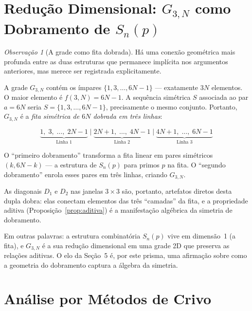 \documentclass[12pt,a4paper]{article}
\theoremstyle{remark}
\newtheorem{remark}[theorem]{Observa\c{c}\~ao}
\begin{document}
	\section{Redu\c{c}\~ao Dimensional: $G_{3,N}$ como Dobramento de $S_n(p)$}
	
	\begin{remark}[A grade como fita dobrada]
		H\'a uma conex\~ao geom\'etrica mais profunda entre as duas estruturas que permanece
		impl\'icita nos argumentos anteriores, mas merece ser registrada explicitamente.
		
		A grade $G_{3,N}$ cont\'em os \'impares $\{1, 3, \ldots, 6N-1\}$ --- exatamente
		$3N$ elementos.  O maior elemento \'e $f(3,N) = 6N-1$.
		A sequ\^encia sim\'etrica $S$ associada ao par $a = 6N$ seria
		$S = \{1, 3, \ldots, 6N-1\}$, precisamente o mesmo conjunto.
		Portanto, $G_{3,N}$ \'e a \emph{fita sim\'etrica de $6N$ dobrada em tr\^es linhas}:
		
		\[
		\underbrace{1,\; 3,\;\ldots,\; 2N-1}_{\text{Linha 1}}
		\;\Big|\;
		\underbrace{2N+1,\;\ldots,\; 4N-1}_{\text{Linha 2}}
		\;\Big|\;
		\underbrace{4N+1,\;\ldots,\; 6N-1}_{\text{Linha 3}}
		\]
		
		O ``primeiro dobramento'' transforma a fita linear em pares sim\'etricos $(k, 6N-k)$
		--- a estrutura de $S_n(p)$ para primos $p$ na fita.
		O ``segundo dobramento'' enrola esses pares em tr\^es linhas, criando $G_{3,N}$.
		
		As diagonais $D_1$ e $D_2$ nas janelas $3\times 3$ s\~ao, portanto, artefatos diretos
		desta dupla dobra: elas conectam elementos das tr\^es ``camadas'' da fita,
		e a propriedade aditiva (Proposi\c{c}\~ao~\ref{prop:aditiva}) \'e a manifesta\c{c}\~ao
		alg\'ebrica da simetria de dobramento.
		
		Em outras palavras: a estrutura combinat\'oria $S_n(p)$ vive em dimens\~ao~1
		(a fita), e $G_{3,N}$ \'e a sua redu\c{c}\~ao dimensional em uma grade 2D que
		preserva as rela\c{c}\~oes aditivas. O elo da Se\c{c}\~ao~5 \'e, por este prisma,
		uma afirma\c{c}\~ao sobre como a geometria do dobramento captura a \'algebra da simetria.
	\end{remark}
	
	\section{An\'alise por M\'etodos de Crivo}
	
\end{document}
